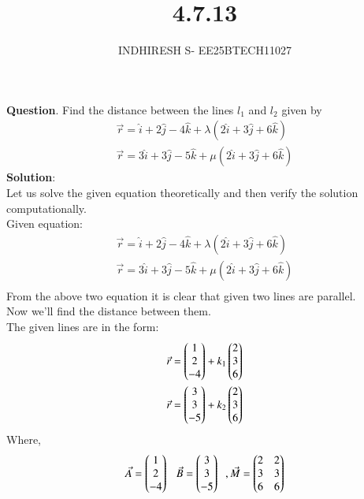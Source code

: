 \documentclass[journal]{IEEEtran}
\theoremstyle{remark}
\begin{document}

\onecolumn

\title{4.7.13}
\author{INDHIRESH S- EE25BTECH11027}
\maketitle


\renewcommand{\thefigure}{\theenumi}
\renewcommand{\thetable}{\theenumi}

\textbf{Question}.   Find the distance between the lines $l_1$ and $l_2$ given by
\begin{align*}
    \overrightarrow{r}=\hat{i}+2\hat{j}-4\hat{k}+\lambda(2\hat{i}+3\hat{j}+6\hat{k})\\\overrightarrow{r}=3\hat{i}+3\hat{j}-5\hat{k}+\mu(2\hat{i}+3\hat{j}+6\hat{k})
\end{align*}
\textbf{Solution}:\\
Let us solve the given equation theoretically and then verify the solution computationally. \\
Given equation:
\begin{align}
   \Vec{r}=\hat{i}+2\hat{j}-4\hat{k}+\lambda(2\hat{i}+3\hat{j}+6\hat{k}) \\
\Vec{r}=3\hat{i}+3\hat{j}-5\hat{k}+\mu(2\hat{i}+3\hat{j}+6\hat{k})\\
\end{align}
From the above two equation it is clear that given two lines are parallel.\\
Now we'll find the distance between them.\\
The given lines are in the form:
\begin{align}
   \Vec{r} = \begin{pmatrix}1\\2\\-4\end{pmatrix} + k_1\begin{pmatrix}2\\3\\6\end{pmatrix}\\
   \Vec{r} = \begin{pmatrix}3\\3\\-5\end{pmatrix}+ k_2\begin{pmatrix}2\\3\\6\end{pmatrix}
\end{align}
Where,
\begin{align}
    \Vec{A}=\begin{pmatrix}1\\2\\-4\end{pmatrix}\;\;\,\Vec{B}=\begin{pmatrix}3\\3\\-5\end{pmatrix}\;\;,\Vec{M}=\begin{pmatrix}2&2\\3&3\\6&6\end{pmatrix}
\end{align}
\end{document}
